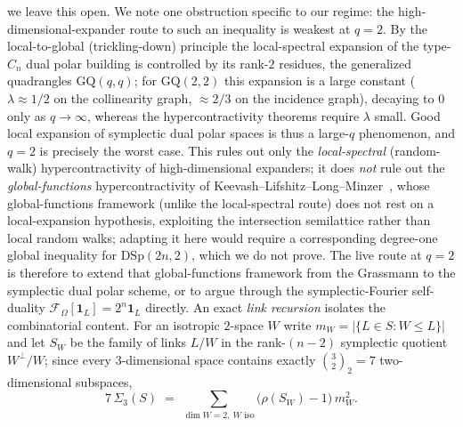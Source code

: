 \documentclass[11pt,a4paper]{article}
\theoremstyle{plain}
\theoremstyle{definition}
\begin{document}
we leave this open. We note one obstruction specific to our regime: the high-dimensional-expander route to such an inequality is weakest at $q=2$. By the local-to-global (trickling-down) principle the local-spectral expansion of the type-$C_n$ dual polar building is controlled by its rank-$2$ residues, the generalized quadrangles $\mathrm{GQ}(q,q)$; for $\mathrm{GQ}(2,2)$ this expansion is a large constant ($\lambda \approx 1/2$ on the collinearity graph, $\approx 2/3$ on the incidence graph), decaying to $0$ only as $q \to \infty$, whereas the hypercontractivity theorems require $\lambda$ small. Good local expansion of symplectic dual polar spaces is thus a large-$q$ phenomenon, and $q=2$ is precisely the worst case. This rules out only the \emph{local-spectral} (random-walk) hypercontractivity of high-dimensional expanders; it does \emph{not} rule out the \emph{global-functions} hypercontractivity of Keevash--Lifshitz--Long--Minzer~\cite{KLLM2024}, whose global-functions framework (unlike the local-spectral route) does not rest on a local-expansion hypothesis, exploiting the intersection semilattice rather than local random walks; adapting it here would require a corresponding degree-one global inequality for $\mathrm{DSp}(2n,2)$, which we do not prove. The live route at $q=2$ is therefore to extend that global-functions framework from the Grassmann to the symplectic dual polar scheme, or to argue through the symplectic-Fourier self-duality $\mathcal F_\Omega[\mathbf 1_L] = 2^n \mathbf 1_L$ directly. An exact \emph{link recursion} isolates the combinatorial content. For an isotropic $2$-space $W$ write $m_W = |\{L \in S : W \le L\}|$ and let $S_W$ be the family of links $L/W$ in the rank-$(n-2)$ symplectic quotient $W^{\perp}/W$; since every $3$-dimensional space contains exactly $\binom{3}{2}_2 = 7$ two-dimensional subspaces,
\[
7\,\Sigma_3(S) \;=\; \sum_{\dim W = 2,\ W \text{ iso}} \bigl(\rho(S_W) - 1\bigr)\, m_W^2 .
\]
\end{document}
